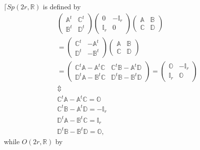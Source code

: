 \documentclass[aps,preprint]{revtex4}
\begin{document}
$\lceil Sp\left( 2r,\mathbb{R}\right) $ is defined by 
\begin{gather}
\left( 
\begin{array}{cc}
\mathbb{A}^{t} & \mathbb{C}^{t} \\ 
\mathbb{B}^{t} & \mathbb{D}^{t}%
\end{array}
\right) \left( 
\begin{array}{cc}
0 & -\mathbb{I}_{r} \\ 
\mathbb{I}_{r} & 0%
\end{array}
\right) \left( 
\begin{array}{cc}
\mathbb{A} & \mathbb{B} \\ 
\mathbb{C} & \mathbb{D}%
\end{array}
\right) \\
=\left( 
\begin{array}{cc}
\mathbb{C}^{t} & -\mathbb{A}^{t} \\ 
\mathbb{D}^{t} & -\mathbb{B}^{t}%
\end{array}
\right) \left( 
\begin{array}{cc}
\mathbb{A} & \mathbb{B} \\ 
\mathbb{C} & \mathbb{D}%
\end{array}
\right) \\
=\left( 
\begin{array}{cc}
\mathbb{C}^{t}\mathbb{A-A}^{t}\mathbb{C} & \mathbb{C}^{t}\mathbb{B-A}^{t}%
\mathbb{D} \\ 
\mathbb{D}^{t}\mathbb{A-B}^{t}\mathbb{C} & \mathbb{D}^{t}\mathbb{B-B}^{t}%
\mathbb{D}%
\end{array}
\right) =\left( 
\begin{array}{cc}
\mathbb{O} & -\mathbb{I}_{r} \\ 
\mathbb{I}_{r} & \mathbb{O}%
\end{array}
\right) \\
\Updownarrow \\
\mathbb{C}^{t}\mathbb{A-A}^{t}\mathbb{C}=\mathbb{O} \\
\mathbb{C}^{t}\mathbb{B-A}^{t}\mathbb{D}=-\mathbb{I}_{r} \\
\mathbb{D}^{t}\mathbb{A-B}^{t}\mathbb{C}=\mathbb{I}_{r} \\
\mathbb{D}^{t}\mathbb{B-B}^{t}\mathbb{D}=\mathbb{O},
\end{gather}
while $O\left( 2r,\mathbb{R}\right) $ by 
\end{document}
